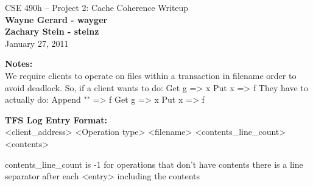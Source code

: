 \documentclass[11pt]{article}
\begin{document}
\begin{center}
{\large CSE 490h -- Project 2: Cache Coherence Writeup} \\
\textbf{Wayne Gerard - wayger} \\
\textbf{Zachary Stein - steinz} \\
January 27, 2011
\end{center}

\textbf{Notes:} \\

We require clients to operate on files within a transaction in filename order to avoid deadlock.
So, if a client wants to do: 
	Get g => x
	Put x => f
They have to actually do:
	Append "" => f
	Get g => x
	Put x => f

\textbf{TFS Log Entry Format:} \\

<client_address>
<Operation type>
<filename>
<contents_line_count>
<contents>

contents_line_count is -1 for operations that don't have contents
there is a line separator after each <entry> including the contents
\end{document}
